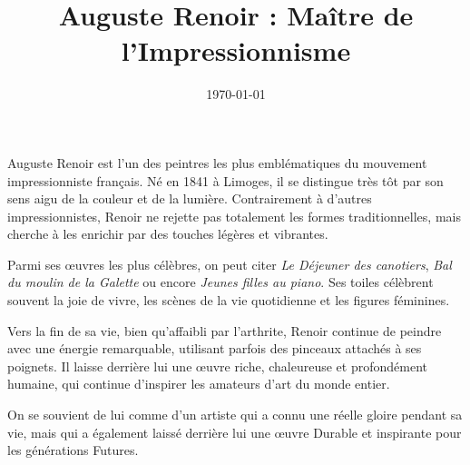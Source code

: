 \documentclass{article}
\title{Auguste Renoir : Maître de l’Impressionnisme}
\author{}
\date{\today}
\begin{document}
\maketitle

Auguste Renoir est l’un des peintres les plus emblématiques du mouvement impressionniste français. Né en 1841 à Limoges, il se distingue très tôt par son sens aigu de la couleur et de la lumière. Contrairement à d'autres impressionnistes, Renoir ne rejette pas totalement les formes traditionnelles, mais cherche à les enrichir par des touches légères et vibrantes.

Parmi ses œuvres les plus célèbres, on peut citer \emph{Le Déjeuner des canotiers}, \emph{Bal du moulin de la Galette} ou encore \emph{Jeunes filles au piano}. Ses toiles célèbrent souvent la joie de vivre, les scènes de la vie quotidienne et les figures féminines.

Vers la fin de sa vie, bien qu'affaibli par l'arthrite, Renoir continue de peindre avec une énergie remarquable, utilisant parfois des pinceaux attachés à ses poignets. Il laisse derrière lui une œuvre riche, chaleureuse et profondément humaine, qui continue d’inspirer les amateurs d’art du monde entier.

On se souvient de lui comme d'un artiste qui a connu une réelle gloire pendant sa vie, mais qui a également laissé derrière lui une œuvre Durable et inspirante pour les générations Futures.
\end{document}
